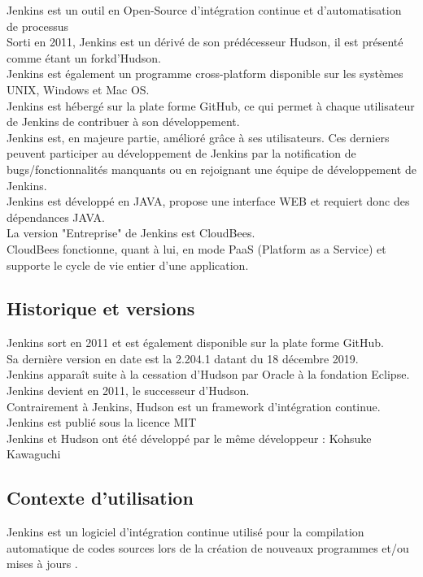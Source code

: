 \documentclass[12pt]{article}
\begin{document}
Jenkins est un outil en Open-Source d'intégration continue et d'automatisation de processus
\\
Sorti en 2011, Jenkins est un dérivé de son prédécesseur Hudson, il est présenté comme étant un fork\footnotemark[1] d'Hudson.
\\
Jenkins est également un programme cross-platform disponible sur les systèmes UNIX, Windows et Mac OS. 
\\
Jenkins est hébergé sur la plate forme GitHub, ce qui permet à chaque utilisateur de Jenkins de contribuer à son développement. 
\\
Jenkins est, en majeure partie, amélioré grâce à ses utilisateurs. Ces derniers peuvent participer au développement de Jenkins par la notification de bugs/fonctionnalités manquants ou en rejoignant une équipe de développement de Jenkins. 
\\
Jenkins est développé en JAVA, propose une interface WEB et requiert donc des dépendances JAVA.
\\
La version "Entreprise" de Jenkins est CloudBees.
\\
CloudBees fonctionne, quant à lui, en mode PaaS (Platform as a Service) et supporte le cycle de vie entier d'une application.

\subsection{Historique et versions}

Jenkins sort en 2011 et est également disponible sur la plate forme GitHub.
\\
Sa dernière version en date est la 2.204.1 datant du 18 décembre 2019.
\\
Jenkins apparaît suite à la cessation d'Hudson par Oracle à la fondation Eclipse. Jenkins devient en 2011, le successeur d'Hudson.
\\
Contrairement à Jenkins, Hudson est un framework d'intégration continue.
\\
Jenkins est publié sous la licence MIT
\\
Jenkins et Hudson ont été développé par le même développeur : Kohsuke Kawaguchi

\subsection{Contexte d'utilisation}

Jenkins est un logiciel d'intégration continue utilisé pour la compilation automatique de codes sources lors de la création de nouveaux programmes et/ou mises à jours .
\end{document}
